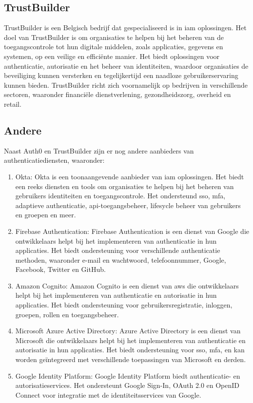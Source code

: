   \subsection{TrustBuilder}%
  \label{subsec:trustbuilder}
  TrustBuilder is een Belgisch bedrijf dat gespecialiseerd is in \gls{iam} oplossingen. Het doel van TrustBuilder is om organisaties te helpen bij het beheren van de toegangscontrole tot hun digitale middelen, zoals applicaties, gegevens en systemen, op een veilige en efficiënte manier. Het biedt oplossingen voor authenticatie, autorisatie en het beheer van identiteiten, waardoor organisaties de beveiliging kunnen versterken en tegelijkertijd een naadloze gebruikerservaring kunnen bieden. TrustBuilder richt zich voornamelijk op bedrijven in verschillende sectoren, waaronder financiële dienstverlening, gezondheidszorg, overheid en retail.
  
  
  \subsection{Andere}%
  \label{subsec:andere}
  Naast Auth0 en TrustBuilder zijn er nog andere aanbieders van authenticatiediensten, waaronder:
  \begin{enumerate}[label=\textbf{-}]
    \item Okta: Okta is een toonaangevende aanbieder van \gls{iam} oplossingen. Het biedt een reeks diensten en tools om organisaties te helpen bij het beheren van gebruikers identiteiten en toegangscontrole. Het ondersteund \gls{sso}, \gls{mfa}, adaptieve authenticatie, \gls{api}-toegangsbeheer, lifesycle beheer van gebruikers en groepen en meer.
    \item Firebase Authentication: Firebase Authentication is een dienst van Google die ontwikkelaars helpt bij het implementeren van authenticatie in hun applicaties. Het biedt ondersteuning voor verschillende authenticatie methoden, waaronder e-mail en wachtwoord, telefoonnummer, Google, Facebook, Twitter en GitHub.
    \item Amazon Cognito: Amazon Cognito is een dienst van \gls{aws} die ontwikkelaars helpt bij het implementeren van authenticatie en autorisatie in hun applicaties. Het biedt ondersteuning voor gebruikersregistratie, inloggen, groepen, rollen en toegangsbeheer.
    \item Microsoft Azure Active Directory: Azure Active Directory is een dienst van Microsoft die ontwikkelaars helpt bij het implementeren van authenticatie en autorisatie in hun applicaties. Het biedt ondersteuning voor \gls{sso}, \gls{mfa}, en kan worden geïntegreerd met verschillende toepassingen van Microsoft en derden.
    \item Google Identity Platform: Google Identity Platform biedt authenticatie- en autorisatieservices. Het ondersteunt Google Sign-In, OAuth 2.0 en OpenID Connect voor integratie met de identiteitsservices van Google.
  \end{enumerate}



